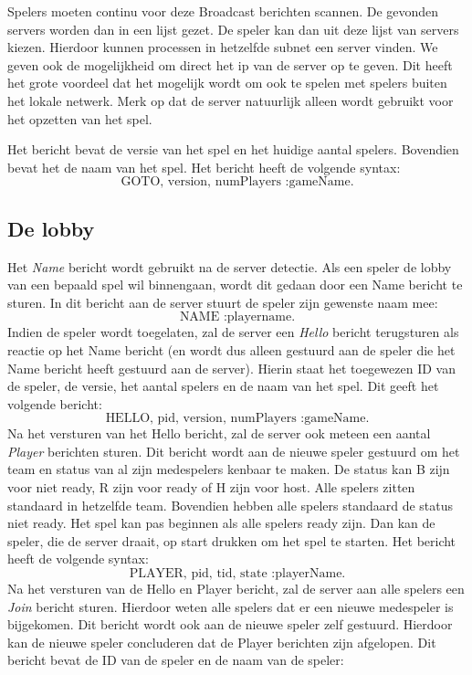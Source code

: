 \documentclass[a4paper,11pt]{article}
\begin{document}
    Spelers moeten continu voor deze Broadcast berichten scannen. De gevonden servers worden dan in een lijst gezet. De speler kan dan uit deze lijst van servers kiezen. Hierdoor kunnen processen in hetzelfde subnet een server vinden. We geven ook de mogelijkheid om direct het ip van de server op te geven. Dit heeft het grote voordeel dat het mogelijk wordt om ook te spelen met spelers buiten het lokale netwerk. Merk op dat de server natuurlijk alleen wordt gebruikt voor het opzetten van het spel.

    Het bericht bevat de versie van het spel en het huidige aantal spelers. Bovendien bevat het de naam van het spel. Het bericht heeft de volgende syntax:
    \[
    \text{GOTO, version, numPlayers :gameName.}
    \]

    \subsection{De lobby}
    Het \emph{Name} bericht wordt gebruikt na de server detectie. Als een speler de lobby van een bepaald spel wil binnengaan, wordt dit gedaan door een Name bericht te sturen. In dit bericht aan de server stuurt de speler zijn gewenste naam mee:
    \[
    \text{NAME :playername.}
    \]
    Indien de speler wordt toegelaten, zal de server een \emph{Hello} bericht terugsturen als reactie op het Name bericht (en wordt dus alleen gestuurd aan de speler die het Name bericht heeft gestuurd aan de server). Hierin staat het toegewezen ID van de speler, de versie, het aantal spelers en de naam van het spel. Dit geeft het volgende bericht:
    \[
    \text{HELLO, pid, version, numPlayers :gameName.}
    \]
    Na het versturen van het Hello bericht, zal de server ook meteen een aantal \emph{Player} berichten sturen. Dit bericht wordt aan de nieuwe speler gestuurd om het team en status van al zijn medespelers kenbaar te maken. De status kan B zijn voor niet ready, R zijn voor ready of H zijn voor host. Alle spelers zitten standaard in hetzelfde team. Bovendien hebben alle spelers standaard de status niet ready. Het spel kan pas beginnen als alle spelers ready zijn. Dan kan de speler, die de server draait, op start drukken om het spel te starten. Het bericht heeft de volgende syntax:
    \[
    \text{PLAYER, pid, tid, state :playerName.}
    \]
    Na het versturen van de Hello en Player bericht, zal de server aan alle spelers een \emph{Join} bericht sturen. Hierdoor weten alle spelers dat er een nieuwe medespeler is bijgekomen. Dit bericht wordt ook aan de nieuwe speler zelf gestuurd. Hierdoor kan de nieuwe speler concluderen dat de Player berichten zijn afgelopen. Dit bericht bevat de ID van de speler en de naam van de speler:
\end{document}
